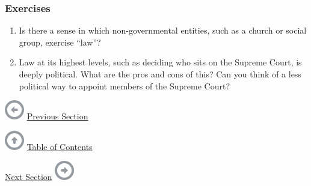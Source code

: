\begin{english}
\hypertarget{mayer_1.0-ch01_s01_s02_n02}{}
\subsubsection{Exercises}\label{exercises}

\begin{enumerate}
\tightlist
\item
  Is there a sense in which non-governmental entities, such as a church
  or social group, exercise ``law''?
\item
  Law at its highest levels, such as deciding who sits on the Supreme
  Court, is deeply political. What are the pros and cons of this? Can
  you think of a less political way to appoint members of the Supreme
  Court?
\end{enumerate}

\end{english}

\hypertarget{navbar-bottom}{}
\href{s04-00-introduction-to-law-and-legal-.html}{\includegraphics{shared/images/batch-left.png}}
\href{s04-00-introduction-to-law-and-legal-.html}{Previous Section}

\href{index.html}{\includegraphics{shared/images/batch-up.png}}
\href{index.html}{Table of Contents}

\href{s04-02-schools-of-legal-thought.html}{Next Section}
\href{s04-02-schools-of-legal-thought.html}{\includegraphics{shared/images/batch-right.png}}
